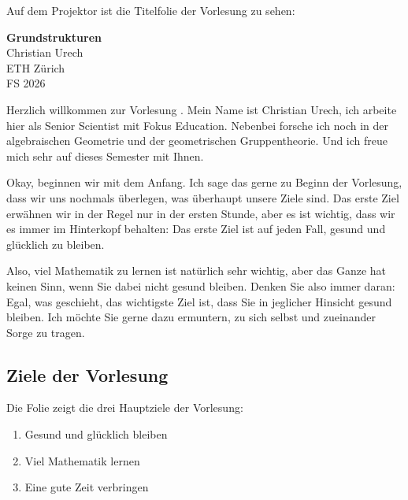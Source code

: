 \begin{meta-note}
Auf dem Projektor ist die Titelfolie der Vorlesung zu sehen:
\begin{center}
\textbf{Grundstrukturen} \\
Christian Urech \\
ETH Zürich \\
FS 2026
\end{center}
\end{meta-note}


\begin{spoken-clean}[00:00:00 - 00:01:08]
Herzlich willkommen zur Vorlesung . Mein Name ist Christian Urech, ich arbeite hier als Senior Scientist mit Fokus Education. Nebenbei forsche ich noch in der algebraischen Geometrie und der geometrischen Gruppentheorie. Und ich freue mich sehr auf dieses Semester mit Ihnen.

Okay, beginnen wir mit dem Anfang. Ich sage das gerne zu Beginn der Vorlesung, dass wir uns nochmals überlegen, was überhaupt unsere Ziele sind. Das erste Ziel erwähnen wir in der Regel nur in der ersten Stunde, aber es ist wichtig, dass wir es immer im Hinterkopf behalten: Das erste Ziel ist auf jeden Fall, gesund und glücklich zu bleiben.

Also, viel Mathematik zu lernen ist natürlich sehr wichtig, aber das Ganze hat keinen Sinn, wenn Sie dabei nicht gesund bleiben. Denken Sie also immer daran: Egal, was geschieht, das wichtigste Ziel ist, dass Sie in jeglicher Hinsicht gesund bleiben. Ich möchte Sie gerne dazu ermuntern, zu sich selbst und zueinander Sorge zu tragen.
\end{spoken-clean}

\subsection{Ziele der Vorlesung}

\begin{meta-note}
Die Folie zeigt die drei Hauptziele der Vorlesung:
\begin{enumerate}[label=\textbf{\arabic*.}]
    \item Gesund und glücklich bleiben
    \item Viel Mathematik lernen
    \item Eine gute Zeit verbringen
\end{enumerate}
\end{meta-note}

